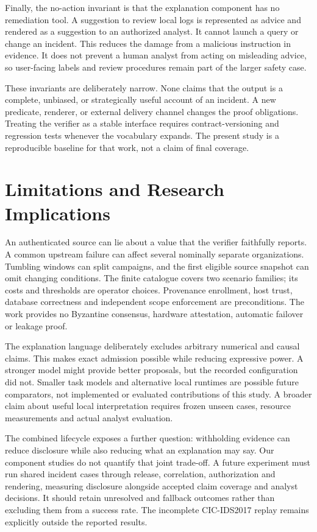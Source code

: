 \documentclass[conference,letterpaper]{IEEEtran}
\begin{document}
Finally, the no-action invariant is that the explanation component has no remediation tool. A suggestion to review local logs is represented as advice and rendered as a suggestion to an authorized analyst. It cannot launch a query or change an incident. This reduces the damage from a malicious instruction in evidence. It does not prevent a human analyst from acting on misleading advice, so user-facing labels and review procedures remain part of the larger safety case.

These invariants are deliberately narrow. None claims that the output is a complete, unbiased, or strategically useful account of an incident. A new predicate, renderer, or external delivery channel changes the proof obligations. Treating the verifier as a stable interface requires contract-versioning and regression tests whenever the vocabulary expands. The present study is a reproducible baseline for that work, not a claim of final coverage.



\section{Limitations and Research Implications}
An authenticated source can lie about a value that the verifier faithfully reports. A common upstream failure can affect several nominally separate organizations. Tumbling windows can split campaigns, and the first eligible source snapshot can omit changing conditions. The finite catalogue covers two scenario families; its costs and thresholds are operator choices. Provenance enrollment, host trust, database correctness and independent scope enforcement are preconditions. The work provides no Byzantine consensus, hardware attestation, automatic failover or leakage proof.

The explanation language deliberately excludes arbitrary numerical and causal claims. This makes exact admission possible while reducing expressive power. A stronger model might provide better proposals, but the recorded configuration did not. Smaller task models and alternative local runtimes are possible future comparators, not implemented or evaluated contributions of this study. A broader claim about useful local interpretation requires frozen unseen cases, resource measurements and actual analyst evaluation.

The combined lifecycle exposes a further question: withholding evidence can reduce disclosure while also reducing what an explanation may say. Our component studies do not quantify that joint trade-off. A future experiment must run shared incident cases through release, correlation, authorization and rendering, measuring disclosure alongside accepted claim coverage and analyst decisions. It should retain unresolved and fallback outcomes rather than excluding them from a success rate. The incomplete CIC-IDS2017 replay remains explicitly outside the reported results.
\end{document}
